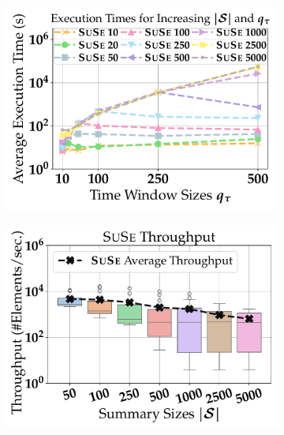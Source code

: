 \begin{figure}[t]
	\centering
	\begin{subfigure}{.38\linewidth}
		\centering
		\includegraphics[width=\linewidth]{revision_plots/execution_time_summary_time_window_comparison.pdf}
		\vspace{-18pt}
		\caption{}
		\label{plot:execution_time_plot}
	\end{subfigure}
	\hfill
	\begin{subfigure}{.38\linewidth}
		\centering
		\includegraphics[width=\linewidth]{revision_plots/throughput_boxplot.pdf}
		\vspace{-18pt}
		\caption{}
		\label{plot:execution_throughput}
	\end{subfigure}


\end{figure}
